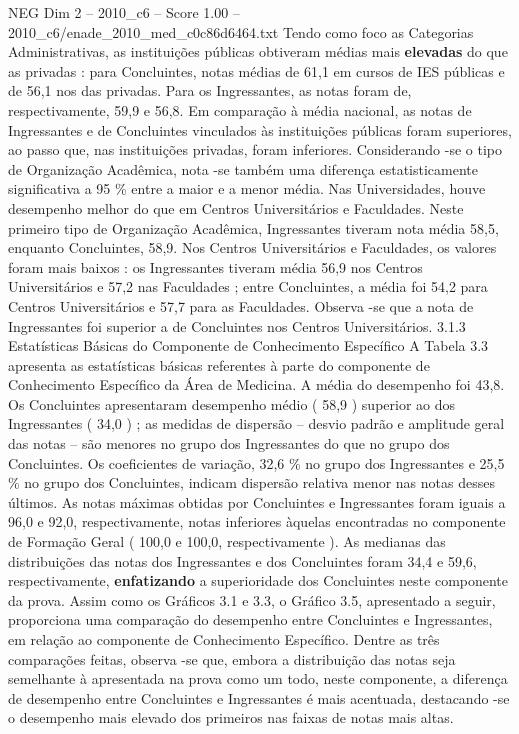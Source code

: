 \begin{textsample}{NEG Dim 2 – 2010\_c6 – Score 1.00 – 2010\_c6/enade\_2010\_med\_c0c86d6464.txt}
Tendo como foco as Categorias Administrativas, as instituições públicas obtiveram médias mais \textbf{elevadas} do que as privadas : para Concluintes, notas médias de 61,1 em cursos de IES públicas e de 56,1 nos das privadas.
Para os Ingressantes, as notas foram de, respectivamente, 59,9 e 56,8.
Em comparação à média nacional, as notas de Ingressantes e de Concluintes vinculados às instituições públicas foram superiores, ao passo que, nas instituições privadas, foram inferiores.
Considerando -se o tipo de Organização Acadêmica, nota -se também uma diferença estatisticamente significativa a 95 \% entre a maior e a menor média.
Nas Universidades, houve desempenho melhor do que em Centros Universitários e Faculdades.
Neste primeiro tipo de Organização Acadêmica, Ingressantes tiveram nota média 58,5, enquanto Concluintes, 58,9.
Nos Centros Universitários e Faculdades, os valores foram mais baixos : os Ingressantes tiveram média 56,9 nos Centros Universitários e 57,2 nas Faculdades ; entre Concluintes, a média foi 54,2 para Centros Universitários e 57,7 para as Faculdades.
Observa -se que a nota de Ingressantes foi superior a de Concluintes nos Centros Universitários. 3.1.3 Estatísticas Básicas do Componente de Conhecimento Específico A Tabela 3.3 apresenta as estatísticas básicas referentes à parte do componente de Conhecimento Específico da Área de Medicina.
A média do desempenho foi 43,8.
Os Concluintes apresentaram desempenho médio ( 58,9 ) superior ao dos Ingressantes ( 34,0 ) ; as medidas de dispersão – desvio padrão e amplitude geral das notas – são menores no grupo dos Ingressantes do que no grupo dos Concluintes.
Os coeficientes de variação, 32,6 \% no grupo dos Ingressantes e 25,5 \% no grupo dos Concluintes, indicam dispersão relativa menor nas notas desses últimos.
As notas máximas obtidas por Concluintes e Ingressantes foram iguais a 96,0 e 92,0, respectivamente, notas inferiores àquelas encontradas no componente de Formação Geral ( 100,0 e 100,0, respectivamente ).
As medianas das distribuições das notas dos Ingressantes e dos Concluintes foram 34,4 e 59,6, respectivamente, \textbf{enfatizando} a superioridade dos Concluintes neste componente da prova.
Assim como os Gráficos 3.1 e 3.3, o Gráfico 3.5, apresentado a seguir, proporciona uma comparação do desempenho entre Concluintes e Ingressantes, em relação ao componente de Conhecimento Específico.
Dentre as três comparações feitas, observa -se que, embora a distribuição das notas seja semelhante à apresentada na prova como um todo, neste componente, a diferença de desempenho entre Concluintes e Ingressantes é mais acentuada, destacando -se o desempenho mais elevado dos primeiros nas faixas de notas mais altas.

\end{textsample}
